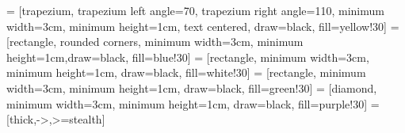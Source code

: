 
%
    
\lstdefinestyle{antlr}{
    basicstyle=\small\ttfamily\color{green!50!black},%
    breaklines=true,%
    moredelim=[s][\color{red}\ttfamily]{'}{'},%
    moredelim=*[s][\color{black}\ttfamily]{options}{\}},%
    commentstyle={\color{gray}\itshape},%
    morecomment=[l]{//},%
    emph={fragment},
    emphstyle={\color{blue}\ttfamily},
    otherkeywords={>,<,.,;,!,=,~},
    morekeywords={>,<,.,;,!,=,~},
    keywordstyle=\color{black}
}

\newenvironment{longlisting}{\captionsetup{type=listing}}{}
\newcommand{\subsubsubsection}[1]{\paragraph{#1}\mbox{}\\}
\usepackage{parskip}
\usepackage{algpseudocode}
\usepackage{algorithm}
\usepackage{bytefield}
\usepackage{xpatch,letltxmacro}
\LetLtxMacro{\cminted}{\minted}
\let\endcminted\endminted
{}
\renewcommand{\figurename}{Listing}
\usepackage{pgf}
\usepackage{luatexja-fontspec}
\usepackage{diagbox}


\usetikzlibrary{positioning}
 = [trapezium, trapezium left angle=70, trapezium right angle=110, minimum width=3cm, minimum height=1cm, text centered, draw=black, fill=yellow!30]
 = [rectangle, rounded corners, minimum width=3cm, minimum height=1cm,draw=black, fill=blue!30]
 = [rectangle, minimum width=3cm, minimum height=1cm, draw=black, fill=white!30]
 = [rectangle, minimum width=3cm, minimum height=1cm, draw=black, fill=green!30]
 = [diamond, minimum width=3cm, minimum height=1cm, draw=black, fill=purple!30]
 = [thick,->,>=stealth]
